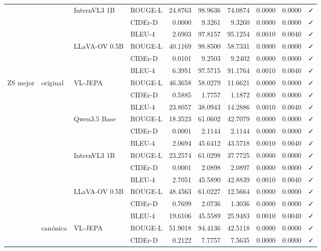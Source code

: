 \begin{tabular}{llllrrrrrl}
\cline{3-10}
 &  & \multirow[t]{3}{*}{InternVL3 1B} & ROUGE-L & 24.8763 & 98.9636 & 74.0874 & 0.0000 & 0.0000 & ✓ \\
 &  &  & CIDEr-D & 0.0000 & 9.3261 & 9.3260 & 0.0000 & 0.0000 & ✓ \\
 &  &  & BLEU-4 & 2.6903 & 97.8157 & 95.1254 & 0.0010 & 0.0040 & ✓ \\
\cline{3-10}
 &  & \multirow[t]{3}{*}{LLaVA-OV 0.5B} & ROUGE-L & 40.1169 & 98.8500 & 58.7331 & 0.0000 & 0.0000 & ✓ \\
 &  &  & CIDEr-D & 0.0101 & 9.2503 & 9.2402 & 0.0000 & 0.0000 & ✓ \\
 &  &  & BLEU-4 & 6.3951 & 97.5715 & 91.1764 & 0.0010 & 0.0040 & ✓ \\
\cline{1-10} \cline{2-10} \cline{3-10}
\multirow[t]{24}{*}{ZS mejor} & \multirow[t]{12}{*}{original} & \multirow[t]{3}{*}{VL-JEPA} & ROUGE-L & 46.3658 & 58.0279 & 11.6621 & 0.0000 & 0.0000 & ✓ \\
 &  &  & CIDEr-D & 0.5885 & 1.7757 & 1.1872 & 0.0000 & 0.0000 & ✓ \\
 &  &  & BLEU-4 & 23.8057 & 38.0943 & 14.2886 & 0.0010 & 0.0040 & ✓ \\
\cline{3-10}
 &  & \multirow[t]{3}{*}{Qwen3.5 Base} & ROUGE-L & 18.3523 & 61.0602 & 42.7079 & 0.0000 & 0.0000 & ✓ \\
 &  &  & CIDEr-D & 0.0001 & 2.1144 & 2.1144 & 0.0000 & 0.0000 & ✓ \\
 &  &  & BLEU-4 & 2.0694 & 45.6412 & 43.5718 & 0.0010 & 0.0040 & ✓ \\
\cline{3-10}
 &  & \multirow[t]{3}{*}{InternVL3 1B} & ROUGE-L & 23.2574 & 61.0298 & 37.7725 & 0.0000 & 0.0000 & ✓ \\
 &  &  & CIDEr-D & 0.0001 & 2.0898 & 2.0897 & 0.0000 & 0.0000 & ✓ \\
 &  &  & BLEU-4 & 2.7051 & 45.5890 & 42.8839 & 0.0010 & 0.0040 & ✓ \\
\cline{3-10}
 &  & \multirow[t]{3}{*}{LLaVA-OV 0.5B} & ROUGE-L & 48.4563 & 61.0227 & 12.5664 & 0.0000 & 0.0000 & ✓ \\
 &  &  & CIDEr-D & 0.7699 & 2.0736 & 1.3036 & 0.0000 & 0.0000 & ✓ \\
 &  &  & BLEU-4 & 19.6106 & 45.5589 & 25.9483 & 0.0010 & 0.0040 & ✓ \\
\cline{2-10} \cline{3-10}
 & \multirow[t]{12}{*}{canónica} & \multirow[t]{3}{*}{VL-JEPA} & ROUGE-L & 51.9018 & 94.4136 & 42.5118 & 0.0000 & 0.0000 & ✓ \\
 &  &  & CIDEr-D & 0.2122 & 7.7757 & 7.5635 & 0.0000 & 0.0000 & ✓ \\

\end{tabular}
